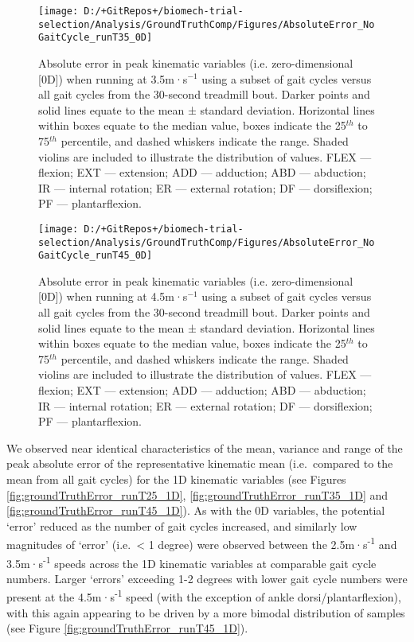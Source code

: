 \documentclass[]{elsarticle} %
\begin{document}
\begin{figure}

{\centering \texttt{[image: D:/+GitRepos+/biomech-trial-selection/Analysis/GroundTruthComp/Figures/AbsoluteError\_NoGaitCycle\_runT35\_0D]} 

}

\caption{Absolute error in peak kinematic variables (i.e. zero-dimensional [0D]) when running at 3.5m·s$^{-1}$ using a subset of gait cycles versus all gait cycles from the 30-second treadmill bout. Darker points and solid lines equate to the mean ± standard deviation. Horizontal lines within boxes equate to the median value, boxes indicate the 25$^{th}$ to 75$^{th}$ percentile, and dashed whiskers indicate the range. Shaded violins are included to illustrate the distribution of values. FLEX — flexion; EXT — extension; ADD — adduction; ABD — abduction; IR — internal rotation; ER — external rotation; DF — dorsiflexion; PF — plantarflexion.}\label{fig:groundTruthError_runT35_0D}
\end{figure}

\begin{figure}

{\centering \texttt{[image: D:/+GitRepos+/biomech-trial-selection/Analysis/GroundTruthComp/Figures/AbsoluteError\_NoGaitCycle\_runT45\_0D]} 

}

\caption{Absolute error in peak kinematic variables (i.e. zero-dimensional [0D]) when running at 4.5m·s$^{-1}$ using a subset of gait cycles versus all gait cycles from the 30-second treadmill bout. Darker points and solid lines equate to the mean ± standard deviation. Horizontal lines within boxes equate to the median value, boxes indicate the 25$^{th}$ to 75$^{th}$ percentile, and dashed whiskers indicate the range. Shaded violins are included to illustrate the distribution of values. FLEX — flexion; EXT — extension; ADD — adduction; ABD — abduction; IR — internal rotation; ER — external rotation; DF — dorsiflexion; PF — plantarflexion.}\label{fig:groundTruthError_runT45_0D}
\end{figure}

We observed near identical characteristics of the mean, variance and
range of the peak absolute error of the representative kinematic mean
(i.e.~compared to the mean from all gait cycles) for the 1D kinematic
variables (see Figures \ref{fig:groundTruthError_runT25_1D},
\ref{fig:groundTruthError_runT35_1D} and
\ref{fig:groundTruthError_runT45_1D}). As with the 0D variables, the
potential `error' reduced as the number of gait cycles increased, and
similarly low magnitudes of `error' (i.e.~\textless{} 1 degree) were
observed between the 2.5m·s\textsuperscript{-1} and
3.5m·s\textsuperscript{-1} speeds across the 1D kinematic variables at
comparable gait cycle numbers. Larger `errors' exceeding 1-2 degrees
with lower gait cycle numbers were present at the
4.5m·s\textsuperscript{-1} speed (with the exception of ankle
dorsi/plantarflexion), with this again appearing to be driven by a more
bimodal distribution of samples (see Figure
\ref{fig:groundTruthError_runT45_1D}).
\end{document}
